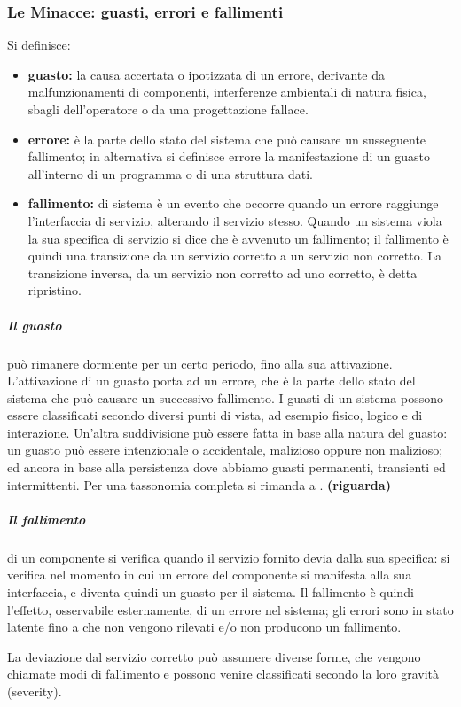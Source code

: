 \documentclass[14pt]{extarticle}
\begin{document}
\subsubsection{Le Minacce: guasti, errori e fallimenti}
Si definisce:\cite{bondavalli2011analisi}
\begin{itemize}
\item \textbf{guasto:} la causa accertata o ipotizzata di un errore, derivante da malfunzionamenti di componenti, interferenze ambientali di natura fisica, sbagli dell’operatore o da una progettazione fallace.
\item \textbf{errore:} è la parte dello stato del sistema che può causare un susseguente fallimento; in alternativa si definisce errore la manifestazione di un guasto all’interno di un programma o di una struttura dati.
\item \textbf{fallimento:} di sistema è un evento che occorre quando un errore raggiunge l’interfaccia di servizio, alterando il servizio stesso. Quando un sistema viola la sua specifica di servizio si dice che è avvenuto un fallimento; il fallimento è quindi una transizione da un servizio corretto a un servizio non corretto. La transizione inversa, da un servizio non corretto ad uno corretto, è detta ripristino.
\end{itemize}

\subparagraph{Il guasto} può rimanere dormiente per un certo periodo, fino alla sua attivazione. L’attivazione di un guasto porta ad un errore, che è la parte dello
stato del sistema che può causare un successivo fallimento. 
I guasti di un sistema possono essere classificati secondo diversi punti di vista, ad esempio
fisico, logico e di interazione. Un’altra suddivisione può essere fatta in base
alla natura del guasto: un guasto può essere intenzionale o accidentale, malizioso oppure non malizioso; ed ancora in base alla persistenza dove abbiamo
guasti permanenti, transienti ed intermittenti. Per una tassonomia completa
si rimanda a \cite{avizienis2004basic}. \textbf{(riguarda)}


\subparagraph{Il fallimento} di un componente si verifica quando il servizio fornito devia
dalla sua specifica: si verifica nel momento in cui un errore del componente
si manifesta alla sua interfaccia, e diventa quindi un guasto per il sistema. Il
fallimento è quindi l’effetto, osservabile esternamente, di un errore nel sistema; gli errori sono in stato latente fino a che non vengono rilevati e/o non
producono un fallimento.

La deviazione dal servizio corretto può assumere diverse forme, che vengono chiamate modi di fallimento e possono venire classificati secondo la loro
gravità (severity).
\end{document}
